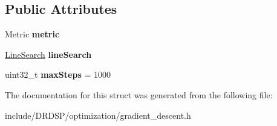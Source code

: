 \subsection*{Public Attributes}
\begin{DoxyCompactItemize}
\item 
\hypertarget{struct_d_r_d_s_p_1_1_gradient_descent_a3d83fb182690e94d667cf7e079706427}{Metric {\bfseries metric}}\label{struct_d_r_d_s_p_1_1_gradient_descent_a3d83fb182690e94d667cf7e079706427}

\item 
\hypertarget{struct_d_r_d_s_p_1_1_gradient_descent_a5da80c1f920af9fca7bbee2e4698848b}{\hyperlink{struct_d_r_d_s_p_1_1_line_search}{Line\-Search} {\bfseries line\-Search}}\label{struct_d_r_d_s_p_1_1_gradient_descent_a5da80c1f920af9fca7bbee2e4698848b}

\item 
\hypertarget{struct_d_r_d_s_p_1_1_gradient_descent_afd2cba8ba783cebeb2abd470242c4d5c}{uint32\-\_\-t {\bfseries max\-Steps} = 1000}\label{struct_d_r_d_s_p_1_1_gradient_descent_afd2cba8ba783cebeb2abd470242c4d5c}

\end{DoxyCompactItemize}


The documentation for this struct was generated from the following file\-:\begin{DoxyCompactItemize}
\item 
include/\-D\-R\-D\-S\-P/optimization/gradient\-\_\-descent.\-h\end{DoxyCompactItemize}
